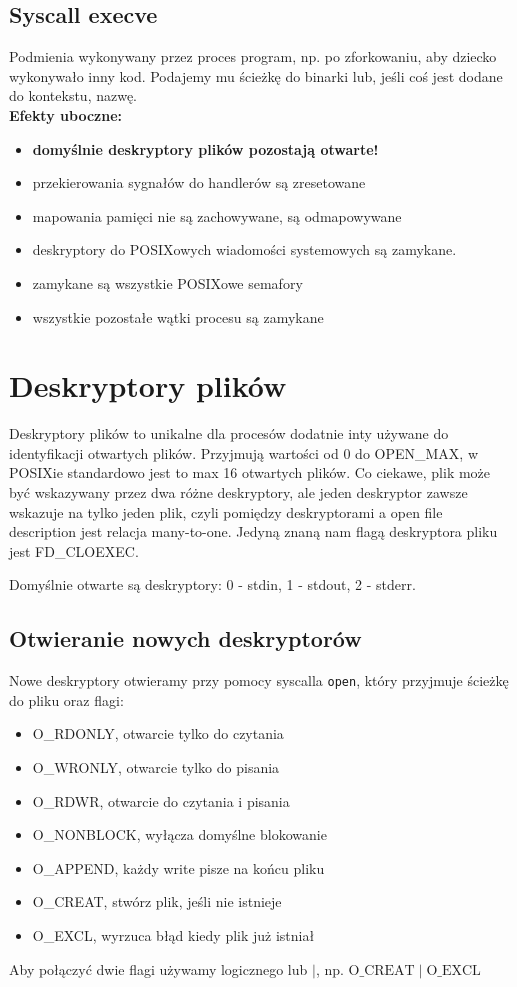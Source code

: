\subsection{Syscall execve}
\label{execve}
Podmienia wykonywany przez proces program, np. po zforkowaniu, aby dziecko wykonywało inny kod. Podajemy mu ścieżkę do binarki lub, jeśli coś jest dodane do kontekstu, nazwę. \\
\textbf{Efekty uboczne:}
\begin{itemize}
	\item \textbf{domyślnie deskryptory plików pozostają otwarte!}
	\item przekierowania sygnałów do handlerów są zresetowane
	\item mapowania pamięci nie są zachowywane, są odmapowywane
	\item deskryptory do POSIXowych wiadomości systemowych są zamykane.
	\item zamykane są wszystkie POSIXowe semafory
	\item wszystkie pozostałe wątki procesu są zamykane
\end{itemize}

\section{Deskryptory plików}
Deskryptory plików to unikalne dla procesów dodatnie inty używane do identyfikacji otwartych plików. Przyjmują wartości od 0 do OPEN\_MAX, w POSIXie standardowo jest to max 16 otwartych plików. Co ciekawe, plik może być wskazywany przez dwa różne deskryptory, ale jeden deskryptor zawsze wskazuje na tylko jeden plik, czyli pomiędzy deskryptorami a open file description jest relacja many-to-one. Jedyną znaną nam flagą deskryptora pliku jest FD\_CLOEXEC.

Domyślnie otwarte są deskryptory: 0 - stdin, 1 - stdout, 2 - stderr.
\subsection{Otwieranie nowych deskryptorów}
Nowe deskryptory otwieramy przy pomocy syscalla \texttt{open}, który przyjmuje ścieżkę do pliku oraz flagi:
\begin{itemize}
	\item O\_RDONLY, otwarcie tylko do czytania
	\item O\_WRONLY, otwarcie tylko do pisania
	\item O\_RDWR, otwarcie do czytania i pisania
	\item O\_NONBLOCK, wyłącza domyślne blokowanie
	\item O\_APPEND, każdy write pisze na końcu pliku
	\item O\_CREAT, stwórz plik, jeśli nie istnieje
	\item O\_EXCL, wyrzuca błąd kiedy plik już istniał
\end{itemize}
Aby połączyć dwie flagi używamy logicznego lub \( \mid \), np. \(\mathrm{O\_CREAT} \mid \mathrm{O\_EXCL}\)

